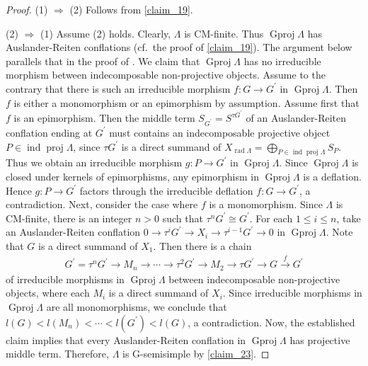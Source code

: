 \documentclass[12pt]{amsart}
\numberwithin{equation}{subsection}
\theoremstyle{plain}
\theoremstyle{definition}
\newcommand{\rad}{\operatorname{rad}}
\newcommand{\proj}{\operatorname{proj}}
\newcommand{\Gproj}{\operatorname{Gproj}}
\newcommand{\ind}{\operatorname{ind}}
\renewcommand{\L}{\Lambda}
\begin{document}
\begin{proof}
(1) $\Rightarrow$ (2) 
Follows from \cref{claim_19}.  





(2) $\Rightarrow$ (1)
Assume (2) holds.
Clearly, $\L$ is CM-finite.
Thus $\Gproj\L$ has Auslander-Reiten conflations (cf.~the proof of \cref{claim_19}).
The argument below parallels that in the proof of \cite[Proposition 3.13]{Hafezi-Bahlekeh_2024}.
We claim that $\Gproj\L$ has no irreducible morphism between indecomposable non-projective objects.
Assume to the contrary that there is such an irreducible morphism $f: G \to G^\prime$ in $\Gproj\L$.
Then $f$ is either a monomorphism or an epimorphism by assumption.
Assume first that $f$ is an epimorphism.
Then the middle term $S_{G^\prime} = S^{\tau G^\prime}$ of an Auslander-Reiten conflation ending at $G^\prime$ must contains an indecomposable projective object $P\in\ind\proj\L$, since $\tau G^\prime$ is a direct summand of $X_{\rad\L} = \bigoplus_{P\in\ind\proj\L}S_P$.
Thus we obtain an irreducible morphism $g : P \to G^\prime$ in $\Gproj\L$.
Since $\Gproj\L$ is closed under kernels of epimorphisms,  any epimorphism in $\Gproj\L$ is a deflation. 
Hence $g : P \to G^\prime$  factors through the irreducible deflation $f: G \to G^\prime$, a contradiction.
Next, consider the case where $f$ is a monomorphism.
Since $\L$ is CM-finite, there is an integer $n>0$ such that $\tau^n G^\prime \cong G^\prime$.
For each $1\leq i \leq n$, take an Auslander-Reiten conflation $0\to \tau^i G^\prime \to X_i \to \tau^{i-1}G^\prime \to 0$ in $\Gproj\L$.
Note that $G$ is a direct summand of $X_1$.
Then there is a chain 
\begin{align}
    G^\prime = \tau^n G^\prime \to M_n \to \cdots \to \tau^2 G^\prime \to M_2 \to \tau G^\prime \to G \xrightarrow{f} G^\prime
\end{align}
of irreducible morphisms in $\Gproj\L$ between indecomposable non-projective objects, where each $M_i$ is a direct summand of $X_i$.
Since irreducible morphisms in $\Gproj\L$ are all monomorphisms, we conclude that $l(G) < l(M_n) < \cdots < l(G^\prime) < l(G)$, a contradiction.
Now, the established claim implies that every Auslander-Reiten conflation in $\Gproj\L$ has projective middle term.
Therefore, $\L$ is G-semisimple by \cref{claim_23}.
\end{proof}
\end{document}
